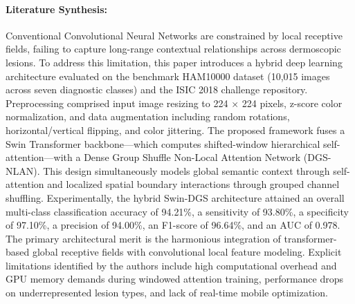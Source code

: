 \paragraph{Literature Synthesis:} Conventional Convolutional Neural Networks are constrained by local receptive fields, failing to capture long-range contextual relationships across dermoscopic lesions. To address this limitation, this paper introduces a hybrid deep learning architecture evaluated on the benchmark HAM10000 dataset (10,015 images across seven diagnostic classes) and the ISIC 2018 challenge repository. Preprocessing comprised input image resizing to 224 $\times$ 224 pixels, z-score color normalization, and data augmentation including random rotations, horizontal/vertical flipping, and color jittering. The proposed framework fuses a Swin Transformer backbone---which computes shifted-window hierarchical self-attention---with a Dense Group Shuffle Non-Local Attention Network (DGS-NLAN). This design simultaneously models global semantic context through self-attention and localized spatial boundary interactions through grouped channel shuffling. Experimentally, the hybrid Swin-DGS architecture attained an overall multi-class classification accuracy of 94.21\%, a sensitivity of 93.80\%, a specificity of 97.10\%, a precision of 94.00\%, an F1-score of 96.64\%, and an AUC of 0.978. The primary architectural merit is the harmonious integration of transformer-based global receptive fields with convolutional local feature modeling. Explicit limitations identified by the authors include high computational overhead and GPU memory demands during windowed attention training, performance drops on underrepresented lesion types, and lack of real-time mobile optimization.


